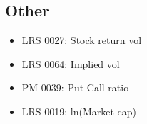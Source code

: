 \documentclass[a4paper]{report}
\begin{document}
\begin{article}
\section{Other}
\begin{itemize}
\item LRS 0027: Stock return vol
\item LRS 0064: Implied vol
\item PM 0039: Put-Call ratio
\item LRS 0019: ln(Market cap)
\end{itemize}

\end{article}
\end{document}
